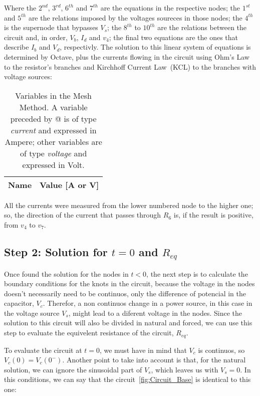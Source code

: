 Where the $2^{nd}$, $3^{rd}$, $6^{th}$ and $7^{th}$ are the equations in the respective nodes; the $1^{st}$ and $5^{th}$ are the relations imposed by the voltages soureces in those nodes; the $4^{th}$ is the supernode that bypasses $V_s$; the $8^{th}$ to $10^{th}$ are the relations between the circuit and, in order, $V_b$, $I_d$ and $v_4$; the final two equations are the ones that describe $I_b$ and $V_d$, respectivly. 
The solution to this linear system of equations is determined by Octave, plus the currents flowing in the circuit using Ohm's Law to the resistor's branches and Kirchhoff Current Law~(KCL) to the branches with voltage sources:

\begin{table}[h]
  \centering
  \begin{tabular}{|l|r|}
    \hline    
    {\bf Name} & {\bf Value [A or V]} \\ \hline
    
  \end{tabular}
  \caption{Variables in the Mesh Method. A variable preceded by @ is of type {\em current} and expressed in Ampere; other variables are of type {\em voltage} and expressed in Volt.}
  \label{tab:TEO_PASSO1}
\end{table}

All the currents were measured from the lower numbered node to the higher one; so, the direction of the current that passes through $R_6$ is, if the result is positive, from $v_4$ to $v_7$.

\subsection{Step 2: Solution for $t=0$ and $R_{eq}$}

Once found the solution for the nodes in $t<0$, the next step is to calculate the boundary conditions for the knots in the circuit, because the voltage in the nodes doesn't necessarily need to be continuos, only the difference of potencial in the capacitor, $V_c$. Therefor, a non continuos change in a power source, in this case in the voltage source $V_s$, might lead to a diferent voltage in the nodes.
Since the solution to this circuit will also be divided in natural and forced, we can use this step to evaluate the equivelent resistance of the circuit, $R_{eq}$.

To evaluate the circuit at $t=0$, we must have in mind that $V_c$ is continuos, so $V_c(0)=V_c(0^-)$. Another point to take into account is that, for the natural solution, we can ignore the sinusoidal part of $V_s$, which leaves us with $V_s=0$. In this conditions, we can say that the circuit~\ref{fig:Circuit_Base} is identical to this one:

